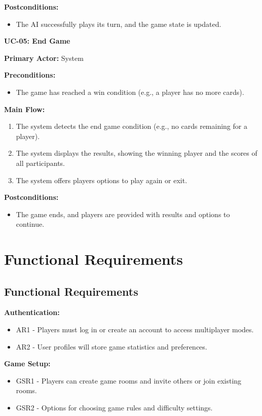 \documentclass{article}
\begin{document}
\textbf{Postconditions:}
\begin{itemize}
    \item The AI successfully plays its turn, and the game state is updated.
\end{itemize}

\textbf{UC-05: End Game}

\textbf{Primary Actor:} System

\textbf{Preconditions:}
\begin{itemize}
    \item The game has reached a win condition (e.g., a player has no more cards).
\end{itemize}

\textbf{Main Flow:}
\begin{enumerate}
    \item The system detects the end game condition (e.g., no cards remaining for a player).
    \item The system displays the results, showing the winning player and the scores of all participants.
    \item The system offers players options to play again or exit.
\end{enumerate}

\textbf{Postconditions:}
\begin{itemize}
    \item The game ends, and players are provided with results and options to continue.
\end{itemize}

\section{Functional Requirements}

\subsection{Functional Requirements}

\textbf{Authentication:}
\begin{itemize}
    \item AR1 - Players must log in or create an account to access multiplayer modes.
    \item AR2 - User profiles will store game statistics and preferences.
\end{itemize}

\textbf{Game Setup:}
\begin{itemize}
    \item GSR1 - Players can create game rooms and invite others or join existing rooms.
    \item GSR2 - Options for choosing game rules and difficulty settings.
\end{itemize}
\end{document}
